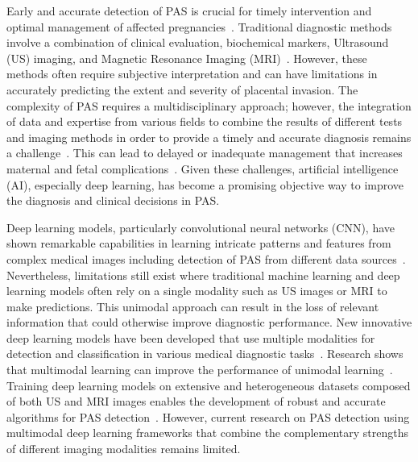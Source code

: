 \documentclass[12pt]{article}
\begin{document}
Early and accurate detection of PAS is crucial for timely intervention and optimal management of affected pregnancies~\cite{Cahill_2018}. Traditional diagnostic methods involve a combination of clinical evaluation, biochemical markers, Ultrasound (US) imaging, and Magnetic Resonance Imaging (MRI)~\cite{Arakaza_2023}. However, these methods often require subjective interpretation and can have limitations in accurately predicting the extent and severity of placental invasion. The complexity of PAS requires a multidisciplinary approach; however, the integration of data and expertise from various fields to combine the results of different tests and imaging methods in order to provide a timely and accurate diagnosis remains a challenge~\cite{Morlando_2020, Wang_2023}. This can lead to delayed or inadequate management that increases maternal and fetal complications~\cite{Wang_2023}. Given these challenges, artificial intelligence (AI), especially deep learning, has become a promising objective way to improve the diagnosis and clinical decisions in PAS.

Deep learning models, particularly convolutional neural networks (CNN), have shown remarkable capabilities in learning intricate patterns and features from complex medical images including detection of PAS from different data sources~\cite{Pei_2023}. Nevertheless, limitations still exist where traditional machine learning and deep learning models often rely on a single modality such as US images or MRI to make predictions. This unimodal approach can result in the loss of relevant information that could otherwise improve diagnostic performance. New innovative deep learning models have been developed that use multiple modalities for detection and classification in various medical diagnostic tasks~\cite{Venugopalan_2021, Holste_2021, Yan_2021}. Research shows that multimodal learning can improve the performance of unimodal learning~\cite{Pei_2023}. Training deep learning models on extensive and heterogeneous datasets composed of both US and MRI images enables the development of robust and accurate algorithms for PAS detection~\cite{Wang_2023}. However, current research on PAS detection using multimodal deep learning frameworks that combine the complementary strengths of different imaging modalities remains limited.
\end{document}
